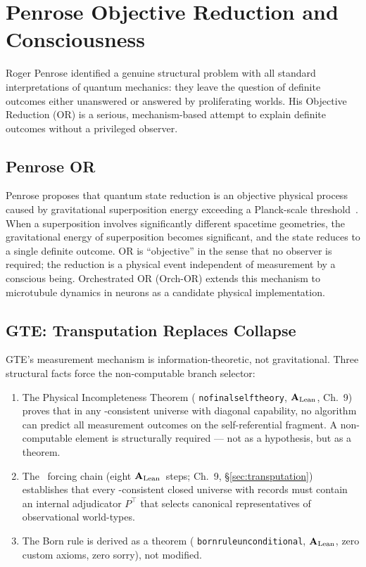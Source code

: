 \documentclass[11pt,openany]{book}
\theoremstyle{remark}
\newcommand{\PSC}{\text{PSC}}
\newcommand{\lean}[1]{%
  \penalty-100
  \begingroup\def\_{\textunderscore\allowbreak}\texttt{#1}\endgroup}
\newcommand{\CatAL}{\ensuremath{\textbf{A}_{\rm Lean}}}
\begin{document}
\section{Penrose Objective Reduction and Consciousness}
\label{sec:penrose}

Roger Penrose identified a genuine structural problem with all standard interpretations
of quantum mechanics: they leave the question of definite outcomes either unanswered or
answered by proliferating worlds.  His Objective Reduction (OR) is a serious,
mechanism-based attempt to explain definite outcomes without a privileged observer.

\subsection*{Penrose OR}

Penrose proposes that quantum state reduction is an objective physical process caused by
gravitational superposition energy exceeding a Planck-scale
threshold~\cite{Penrose1994}.  When a superposition involves significantly different
spacetime geometries, the gravitational energy of superposition becomes significant, and
the state reduces to a single definite outcome.  OR is ``objective'' in the sense that
no observer is required; the reduction is a physical event independent of measurement
by a conscious being.  Orchestrated OR (Orch-OR) extends this mechanism to microtubule
dynamics in neurons as a candidate physical implementation.

\subsection*{GTE: Transputation Replaces Collapse}

GTE's measurement mechanism is information-theoretic, not gravitational.  Three
structural facts force the non-computable branch selector:

\begin{enumerate}
\item The Physical Incompleteness Theorem (\lean{no\_final\_self\_theory}, \CatAL, Ch.~9)
  proves that in any \PSC-consistent universe with diagonal capability, no algorithm can
  predict all measurement outcomes on the self-referential fragment.  A non-computable
  element is structurally required — not as a hypothesis, but as a theorem.

\item The \PSC\ forcing chain (eight \CatAL\ steps; Ch.~9, §\ref{sec:transputation})
  establishes that every \PSC-consistent closed universe with records must contain an
  internal adjudicator $P^\top$ that selects canonical representatives of
  observational world-types.

\item The Born rule is derived as a theorem (\lean{born\_rule\_unconditional}, \CatAL,
  zero custom axioms, zero sorry), not modified.
\end{enumerate}
\end{document}
